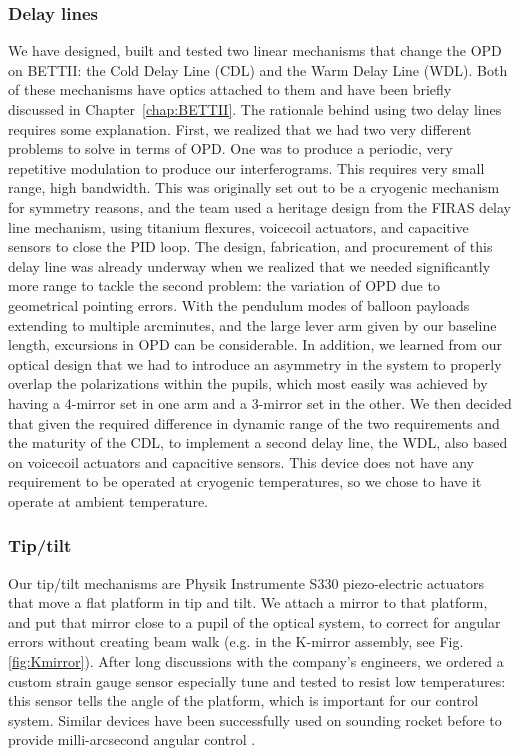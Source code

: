 \subsubsection{Delay lines}
\label{subsec:delayLines}

We have designed, built and tested two linear mechanisms that change the OPD on BETTII: the Cold Delay Line (CDL) and the Warm Delay Line (WDL). Both of these mechanisms have optics attached to them and have been briefly discussed in Chapter~\ref{chap:BETTII}. The rationale behind using two delay lines requires some explanation. First, we realized that we had two very different problems to solve in terms of OPD. One was to produce a periodic, very repetitive modulation to produce our interferograms. This requires very small range, high bandwidth. This was originally set out to be a cryogenic mechanism for symmetry reasons, and the team used a heritage design from the FIRAS delay line mechanism, using titanium flexures, voicecoil actuators, and capacitive sensors to close the PID loop. The design, fabrication, and procurement of this delay line was already underway when we realized that we needed significantly more range to tackle the second problem: the variation of OPD due to geometrical pointing errors. With the pendulum modes of balloon payloads extending to multiple arcminutes, and the large lever arm given by our baseline length, excursions in OPD can be considerable. In addition, we learned from our optical design that we had to introduce an asymmetry in the system to properly overlap the polarizations within the pupils, which most easily was achieved by having a 4-mirror set in one arm and a 3-mirror set in the other. We then decided that given the required difference in dynamic range of the two requirements and the maturity of the CDL, to implement a second delay line, the WDL, also based on voicecoil actuators and capacitive sensors. This device does not have any requirement to be operated at cryogenic temperatures, so we chose to have it operate at ambient temperature.

\subsubsection{Tip/tilt}

Our tip/tilt mechanisms are Physik Instrumente S330 piezo-electric actuators that move a flat platform in tip and tilt. We attach a mirror to that platform, and put that mirror close to a pupil of the optical system, to correct for angular errors without creating beam walk (e.g. in the K-mirror assembly, see Fig.\ref{fig:Kmirror}). After long discussions with the company's engineers, we ordered a custom strain gauge sensor especially tune and tested to resist low temperatures: this sensor tells the angle of the platform, which is important for our control system. Similar devices have been successfully used on sounding rocket before to provide milli-arcsecond angular control \citep{Mendillo:2012fh}. 

